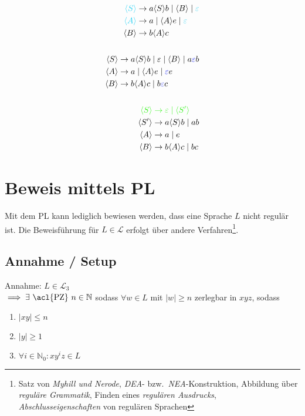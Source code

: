 \documentclass[a4paper,parskip=half,footsepline=on,headings=normal,titlepage=false]{scrartcl}
\newcommand{\nt}[1]{\langle \uppercase{#1} \rangle}
\renewcommand{\epsilon}{\varepsilon}
\begin{document}
\begin{subequations}
\begin{align}
    \label{eq:epsilon:1_search}
    \begin{split}
    \color{c1}\nt{S} & \to a \nt{S} b \mid \nt{B} \mid \color{c1}\epsilon \\
    \color{c1}\nt{A} & \to a \mid \nt{A}e \mid \color{c1}\epsilon \\
    \nt{B} & \to b\nt{A}c
    \end{split}
    \\ \nonumber \\
    \label{eq:epsilon:2_elemination}
    \begin{split}
    \nt{S} & \to a \nt{S} b \mid \epsilon \mid \nt{B} \mid a{\color{c2}\epsilon}b \\
    \nt{A} & \to a \mid \nt{A}e \mid {\color{c2}\epsilon}e \\
    \nt{B} & \to b\nt{A}c \mid b{\color{c2}\epsilon}c
    \end{split}
    \\ \nonumber \\
    \label{eq:epsilon:3_isolation}
    \begin{split}
    \color{c3}\nt{S} & \color{c3}\to \epsilon \mid \nt{S'} \\
    \nt{S'} & \to a \nt{S} b \mid ab \\
    \nt{A} & \to a \mid e \\
    \nt{B} & \to b\nt{A}c \mid bc
    \end{split}
\end{align}
\end{subequations}

\section{Beweis mittels \acl{PL}}
Mit dem \ac{PL} kann lediglich bewiesen werden, dass eine Sprache $L$ nicht regulär ist.
Die Beweisführung für $L \in \mathcal{L}$ erfolgt über andere Verfahren\footnote{Satz von \emph{Myhill und Nerode}, \emph{\acs{DEA}}- bzw.\ \emph{\acs{NEA}}-Konstruktion, Abbildung über \emph{reguläre Grammatik}, Finden eines \emph{regulären Ausdrucks}, \emph{Abschlusseigenschaften} von regulären Sprachen}.

\subsection{Annahme / Setup}
Annahme: $L \in \mathcal{L}_3$ \\
$\implies \exists \text{ \acl{PZ} } n \in \mathbb{N}$ sodass $\forall w \in L$ mit $|w| \ge n$ zerlegbar in $xyz$, sodass
\begin{enumerate}
    \item $|xy| \le n$
    \item $|y| \ge 1$
    \item $\forall i \in \mathbb{N}_0 : xy^iz \in L$
\end{enumerate}
\end{document}
